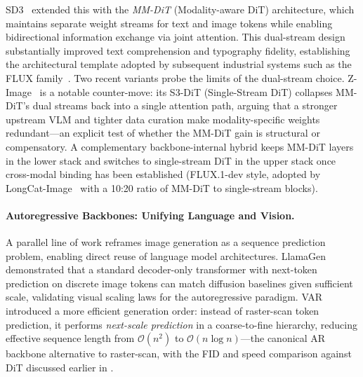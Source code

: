\documentclass{llmxive}
\begin{document}
SD3~\citep{esser2024stablediffusion3} extended this with the \emph{MM-DiT} (Modality-aware DiT) architecture, which maintains separate weight streams for text and image tokens while enabling bidirectional information exchange via joint attention. This dual-stream design substantially improved text comprehension and typography fidelity, establishing the architectural template adopted by subsequent industrial systems such as the FLUX family~\citep{labs2025flux1kontextflowmatching}. Two recent variants probe the limits of the dual-stream choice. Z-Image~\citep{cai2025z} is a notable counter-move: its S3-DiT (Single-Stream DiT) collapses MM-DiT's dual streams back into a single attention path, arguing that a stronger upstream VLM and tighter data curation make modality-specific weights redundant---an explicit test of whether the MM-DiT gain is structural or compensatory. A complementary backbone-internal hybrid keeps MM-DiT layers in the lower stack and switches to single-stream DiT in the upper stack once cross-modal binding has been established (FLUX.1-dev style, adopted by LongCat-Image~\citep{team2025longcat} with a 10:20 ratio of MM-DiT to single-stream blocks).

\paragraph{Autoregressive Backbones: Unifying Language and Vision.}
A parallel line of work reframes image generation as a sequence prediction problem, enabling direct reuse of language model architectures. LlamaGen~\citep{sun2024autoregressive} demonstrated that a standard decoder-only transformer with next-token prediction on discrete image tokens can match diffusion baselines given sufficient scale, validating visual scaling laws for the autoregressive paradigm. VAR~\citep{tian2024visual} introduced a more efficient generation order: instead of raster-scan token prediction, it performs \emph{next-scale prediction} in a coarse-to-fine hierarchy, reducing effective sequence length from $\mathcal{O}(n^2)$ to $\mathcal{O}(n\log n)$---the canonical AR backbone alternative to raster-scan, with the FID and speed comparison against DiT discussed earlier in .
\end{document}

